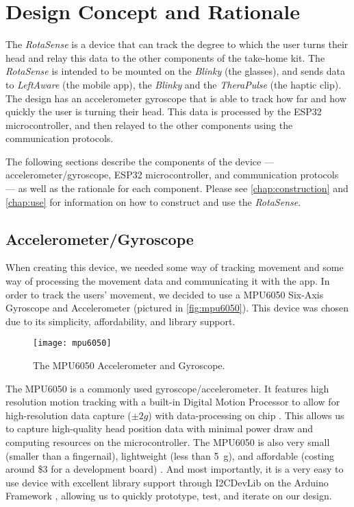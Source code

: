 \chapter{Design Concept and Rationale}
\label{chap:design}

The \textit{RotaSense} is a device that can track the degree to which the user
turns their head and relay this data to the other components of the take-home
kit. The \textit{RotaSense} is intended to be mounted on the \textit{Blinky} (the
glasses), and sends data to \textit{LeftAware} (the mobile app), the
\textit{Blinky} and the \textit{TheraPulse} (the haptic clip). The design has
an accelerometer gyroscope that is able to track how far and how quickly the
user is turning their head. This data is processed by the ESP32
microcontroller, and then relayed to the other components using
the communication protocols. 

The following sections describe the components of the
device --- accelerometer/gyroscope, ESP32 microcontroller, and communication
protocols --- as well as the rationale for each component. Please see
\autoref{chap:construction} and \autoref{chap:use} for information on how to
construct and use the \textit{RotaSense}.

\section{Accelerometer/Gyroscope}\label{sec:mpu6050}

When creating this device, we needed some way of tracking movement and some way
of processing the movement data and communicating it with the app. In order to
track the users’ movement, we decided to use a MPU6050 Six-Axis Gyroscope and
Accelerometer (pictured in \autoref{fig:mpu6050}). This device was chosen due to
its simplicity, affordability, and library support.

\begin{figure}[h]
  \centering
  \texttt{[image: mpu6050]}
  \caption[MPU6050 Accelerometer/Gyroscope]{The MPU6050 Accelerometer and
    Gyroscope.}
  \label{fig:mpu6050}
\end{figure}

The MPU6050 is a commonly used gyroscope/accelerometer. It features high
resolution motion tracking with a built-in Digital Motion Processor to allow for
high-resolution data capture ($\pm 2g$) with data-processing on chip
\cite{mpu6050}. This allows us to capture high-quality head position data with
minimal power draw and computing resources on the microcontroller. The MPU6050
is also very small (smaller than a fingernail), lightweight (less than
\qty{5}{\g}), and affordable (costing around \$3 for a development board)
\cite{mpu6050}. And most importantly, it is a very easy to use device with
excellent library support through I2CDevLib \cite{i2cdevlib} on the Arduino
Framework \cite{arduino}, allowing us to quickly prototype, test, and iterate
on our design.

